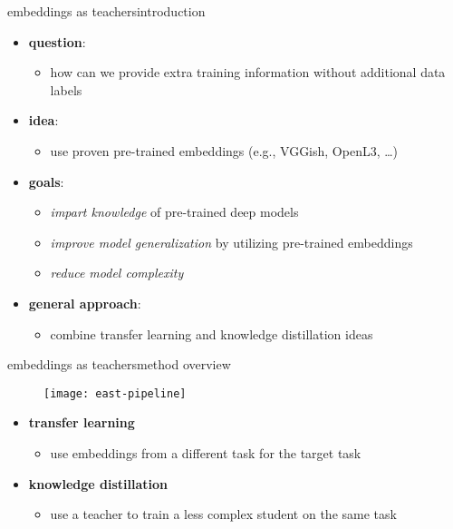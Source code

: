 \begin{frame}{embeddings as teachers}{introduction}
    \begin{itemize}
        \item   \textbf{question}:
            \begin{itemize}
                \item   how can we provide extra training information without additional data labels 
            \end{itemize}
        \bigskip
        \item   \textbf{idea}: 
            \begin{itemize}
                \item use proven pre-trained embeddings (e.g., VGGish, OpenL3, \ldots)
            \end{itemize}
        \bigskip
        \item<2->   \textbf{goals}:
            \begin{itemize}
                \item   \textit{impart knowledge} of pre-trained deep models 
                \item   \textit{improve model generalization} by utilizing pre-trained embeddings
                \item   \textit{reduce model complexity}
            \end{itemize}
				\bigskip
				\item<3-> \textbf{general approach}:
					\begin{itemize}
						\item  combine transfer learning and knowledge distillation ideas
					\end{itemize}
    \end{itemize}
\end{frame}

\begin{frame}{embeddings as teachers}{method overview}
    \begin{figure}%
        \texttt{[image: east-pipeline]}%
    \end{figure}
    \bigskip
    \begin{itemize}
        \item   \textbf{transfer learning}
            \begin{itemize}
                \item   use embeddings from a different task for the target task
            \end{itemize}
            \smallskip
        \item   \textbf{knowledge distillation}
            \begin{itemize}
                \item   use a teacher to train a less complex student on the same task
            \end{itemize}
    \end{itemize}
\end{frame}

